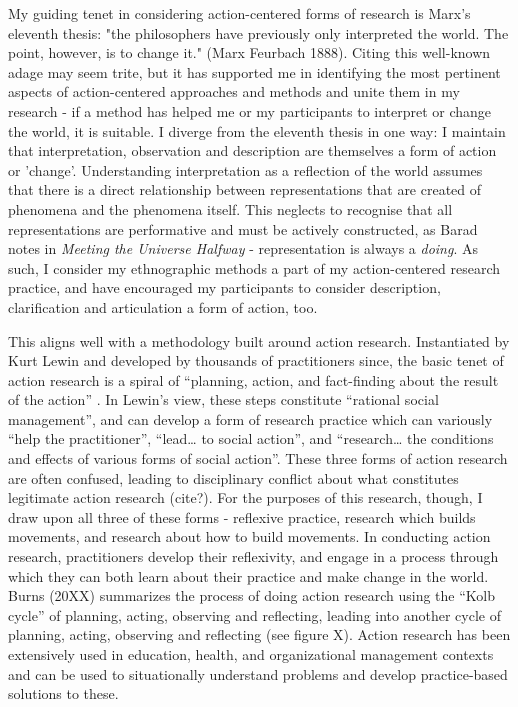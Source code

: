 
My guiding tenet in considering action-centered forms of research is Marx's eleventh thesis: 
"the philosophers have previously only interpreted the world. The point, however, is to change it." (Marx Feurbach 1888). 
Citing this well-known adage may seem trite, but it has supported me in identifying the most pertinent aspects of action-centered approaches and methods and unite them in my research - if a method has helped me or my participants to interpret or change the world, it is suitable. I diverge from the eleventh thesis in one way: I maintain that interpretation, observation and description are themselves a form of action or 'change'. Understanding interpretation as a reflection of the world assumes that there is a direct relationship between representations that are created of phenomena and the phenomena itself. This neglects to recognise that all representations are performative and must be actively constructed, as Barad notes in \textit{Meeting the Universe Halfway} \cite{barad_meeting_2007} - representation is always a \textit{doing}. As such, I consider my ethnographic methods a part of my action-centered research practice, and have encouraged my participants to consider description, clarification and articulation a form of action, too.

This aligns well with a methodology built around action research. Instantiated by Kurt Lewin and developed by thousands of practitioners since, the basic tenet of action research is a spiral of “planning, action, and fact-finding about the result of the action” \citep{lewin_action_1946}. In Lewin’s view, these steps constitute “rational social management”, and can develop a form of research practice which can variously “help the practitioner”, “lead… to social action”, and “research… the conditions and effects of various forms of social action”. These three forms of action research are often confused, leading to disciplinary conflict about what constitutes legitimate action research (cite?). For the purposes of this research, though, I draw upon all three of these forms - reflexive practice, research which builds movements, and research about how to build movements. In conducting action research, practitioners develop their reflexivity, and engage in a process through which they can both learn about their practice and make change in the world. Burns (20XX) summarizes the process of doing action research using the “Kolb cycle” of planning, acting, observing and reflecting, leading into another cycle of planning, acting, observing and reflecting (see figure X). Action research has been extensively used in education, health, and organizational management contexts and can be used to situationally understand problems and develop practice-based solutions to these.

